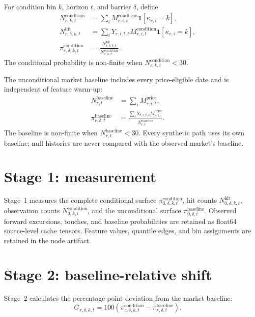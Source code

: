 \documentclass[11pt]{article}
\newcommand{\ind}{\mathbf{1}}
\begin{document}
For condition bin $k$, horizon $t$, and barrier $\delta$, define
\begin{align}
N^{\mathrm{condition}}_{r,k,t}
  &=\sum_i M^{\mathrm{condition}}_{r,i,t}
    \ind[\kappa_{r,i}=k],\\
N^{\mathrm{hit}}_{r,\delta,k,t}
  &=\sum_i Y_{r,i,t,\delta}
    M^{\mathrm{condition}}_{r,i,t}\ind[\kappa_{r,i}=k],\\
\pi^{\mathrm{condition}}_{r,\delta,k,t}
  &=\frac{N^{\mathrm{hit}}_{r,\delta,k,t}}
          {N^{\mathrm{condition}}_{r,k,t}}.
\end{align}
The conditional probability is non-finite when
$N^{\mathrm{condition}}_{r,k,t}<30$.

The unconditional market baseline includes every price-eligible date and is
independent of feature warm-up:
\begin{align}
N^{\mathrm{baseline}}_{r,t}
  &=\sum_i M^{\mathrm{price}}_{r,i,t},\\
\pi^{\mathrm{baseline}}_{r,\delta,t}
  &=\frac{\sum_iY_{r,i,t,\delta}M^{\mathrm{price}}_{r,i,t}}
          {N^{\mathrm{baseline}}_{r,t}}.
\end{align}
The baseline is non-finite when $N^{\mathrm{baseline}}_{r,t}<30$. Every synthetic
path uses its own baseline; null histories are never compared with the
observed market's baseline.

\section{Stage 1: measurement}

Stage~1 measures the complete conditional surface
$\pi^{\mathrm{condition}}_{0,\delta,k,t}$, hit counts
$N^{\mathrm{hit}}_{0,\delta,k,t}$, observation counts
$N^{\mathrm{condition}}_{0,k,t}$, and the unconditional surface
$\pi^{\mathrm{baseline}}_{0,\delta,t}$. Observed forward excursions,
touches, and baseline probabilities are retained as float64 source-level cache
tensors. Feature values, quantile edges, and bin assignments are retained in
the node artifact.

\section{Stage 2: baseline-relative shift}

Stage~2 calculates the percentage-point deviation from the market baseline:
\begin{equation}
G_{r,\delta,k,t}
=100\left(\pi^{\mathrm{condition}}_{r,\delta,k,t}
          -\pi^{\mathrm{baseline}}_{r,\delta,t}\right).
\end{equation}
\end{document}
